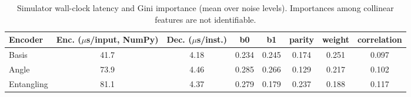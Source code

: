 \begin{table}[htbp]
\centering
\small
\caption{Simulator wall-clock latency and Gini importance (mean over noise levels). Importances among collinear features are not identifiable.}
\label{tab:timing}
\begin{tabular}{lccccccc}
\toprule
Encoder & Enc. ($\mu$s/input, NumPy) & Dec. ($\mu$s/inst.) & b0 & b1 & parity & weight & correlation \\
\midrule
Basis & 41.7 & 4.18 & 0.234 & 0.245 & 0.174 & 0.251 & 0.097 \\
\midrule
Angle & 73.9 & 4.46 & 0.285 & 0.266 & 0.129 & 0.217 & 0.102 \\
\midrule
Entangling & 81.1 & 4.37 & 0.279 & 0.179 & 0.237 & 0.188 & 0.117 \\
\bottomrule
\end{tabular}
\end{table}
